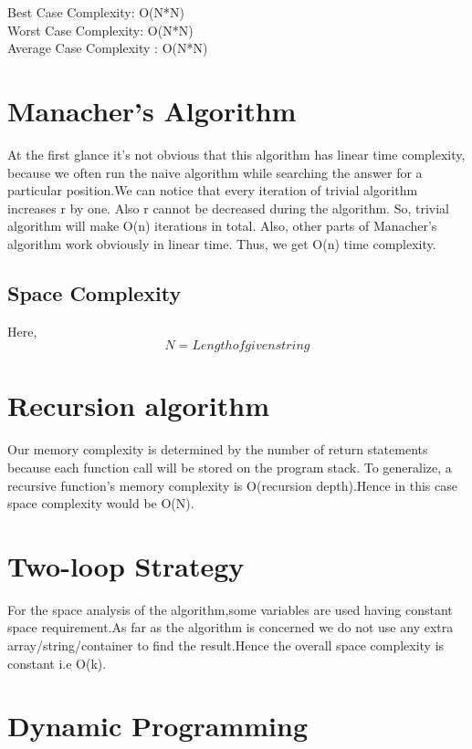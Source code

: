\documentclass[conference]{IEEEtran}
\begin{document}
\bigskip

Best Case Complexity: O(N*N) \\ 

Worst Case Complexity: O(N*N)\\

Average Case Complexity : O(N*N)

\bigskip
\section*{Manacher's Algorithm}

At the first glance it's not obvious that this algorithm has linear time complexity, because we often run the naive algorithm while searching the answer for a particular position.We can notice that every iteration of trivial algorithm increases r by one. Also r cannot be decreased during the algorithm. So, trivial algorithm will make O(n) iterations in total.
Also, other parts of Manacher's algorithm work obviously in linear time. Thus, we get O(n) time complexity.


\bigskip\subsection{Space Complexity}
Here, \[ N = Length of given string\]
\section*{Recursion algorithm}
Our memory complexity is determined by the number of return statements because each function call will be stored on the program stack. To generalize, a recursive function's memory complexity is O(recursion depth).Hence in this case space complexity would be O(N).

\bigskip\section*{Two-loop Strategy}

For the space analysis of the algorithm,some variables are used having constant space requirement.As far as the algorithm is concerned we do not use any extra array/string/container to find the result.Hence the overall space complexity is constant i.e O(k).

\bigskip\section*{Dynamic Programming}
\end{document}
